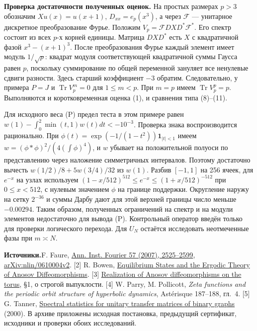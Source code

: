 \documentclass[11pt,a4paper]{article}
\newcommand{\Tr}{\operatorname{Tr}}
\newcommand{\subt}[1]{\par\medskip\noindent\textbf{#1.}\quad}
\begin{document}
\subt{Проверка достаточности полученных оценок} На простых размерах $p>3$ обозначим $X u(x)=u(x+1)$, $D_{xx}=e_p(x^3)$, а через $\mathcal F$ --- унитарное дискретное преобразование Фурье. Положим $V_p=\mathcal F D X D^*\mathcal F^*$. Его спектр состоит из всех $p$-х корней единицы. Матрица $DXD^*$ есть $X$ с квадратичной фазой $x^3-(x+1)^3$. После преобразования Фурье каждый элемент имеет модуль $1/\sqrt p$: квадрат модуля соответствующей квадратичной суммы Гаусса равен $p$, поскольку суммирование по общей переменной зануляет все ненулевые сдвиги разности. Здесь старший коэффициент $-3$ обратим. Следовательно, у примера $P=J$ и $\Tr V_p^m=0$ для $1\le m<p$. При $m=p$ имеем $\Tr V_p^p=p$. Выполняются и коротковременная оценка (1), и сравнения типа (8)--(11).

Для исходного веса (P) предел теста в этом примере равен $w(1)-\int_0^2\min(t,1)w(t)dt<-10^{-3}$. Проверка знака воспроизводится рационально. При $\phi(t)=\exp(-1/(1-t^2))\mathbf1_{|t|<1}$ имеем $w=(\phi*\phi)^2/(4(\int\phi)^4)$, и $w$ убывает на положительной полуоси по представлению через наложение симметричных интервалов. Поэтому достаточно вычесть $w(1/2)/8+5w(3/4)/32$ из $w(1)$. Разбив $[-1,1]$ на 256 ячеек, для $e^{-x}$ на узлах используем $(1-x/512)^{512}\le e^{-x}\le(1+x/512)^{-512}$ при $0\le x<512$, с нулевым значением $\phi$ на границе поддержки. Округление наружу на сетку $2^{-36}$ и суммы Дарбу дают для этой верхней границы число меньше $-0.00294$. Таким образом, полученных ограничений на спектр и на модули элементов недостаточно для вывода (P). Контрольный оператор введён только для проверки логического перехода. Для $U_N$ остаётся исследовать неотмеченные фазы при $m\asymp N$.

\subt{Источники} [1] F. Faure, \href{https://doi.org/10.5802/aif.2341}{Ann. Inst. Fourier 57 (2007), 2525--2599}, \href{https://arxiv.org/abs/nlin/0610004}{arXiv:nlin/0610004v2}. [2] R. Bowen, \href{https://doi.org/10.1007/978-3-540-77695-6}{Equilibrium States and the Ergodic Theory of Anosov Diffeomorphisms}. [3] \href{https://tamara.ccny.cuny.edu/publications/AnosovDiffeos.pdf}{Realization of Anosov diffeomorphisms on the torus}, §1, о строгой выпуклости. [4] W. Parry, M. Pollicott, \emph{Zeta functions and the periodic orbit structure of hyperbolic dynamics}, Astérisque 187--188, гл.~4. [5] G. Tanner, \href{https://doi.org/10.1088/0305-4470/33/18/304}{Spectral statistics for unitary transfer matrices of binary graphs} (2000). В архиве приложены исходная постановка, предыдущий сертификат, исходники и проверки обоих исследований.
\end{document}
